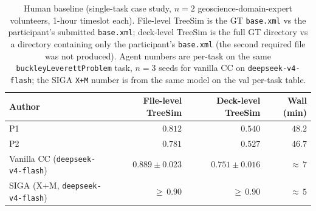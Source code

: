 \documentclass{article}
\begin{document}
\begin{table}[h]
  \caption{Human baseline (single-task case study, $n=2$ geoscience-domain-expert volunteers, 1-hour timeslot each). File-level TreeSim is the GT \texttt{base.xml} vs the participant's submitted \texttt{base.xml}; deck-level TreeSim is the full GT directory vs a directory containing only the participant's \texttt{base.xml} (the second required file was not produced). Agent numbers are per-task on the same \texttt{buckleyLeverettProblem} task, $n=3$ seeds for vanilla CC on \texttt{deepseek-v4-flash}; the SIGA \texttt{X+M} number is from the same model on the val per-task table.}
  \label{tab:human-baseline}
  \centering
  \small
  \begin{tabular}{lrrr}
    \toprule
    \textbf{Author} & \textbf{File-level TreeSim} & \textbf{Deck-level TreeSim} & \textbf{Wall (min)} \\
    \midrule
    P1                                       & $0.812$            & $0.540$            & $48.2$ \\
    P2                                       & $0.781$            & $0.527$            & $46.7$ \\
    Vanilla CC (\texttt{deepseek-v4-flash})  & $0.889 \pm 0.023$  & $0.751 \pm 0.016$  & ${\approx}\,7$ \\
    SIGA (X+M, \texttt{deepseek-v4-flash})   & ${\geq}\,0.90$     & ${\geq}\,0.90$     & ${\approx}\,5$ \\
    \bottomrule
  \end{tabular}
\end{table}
\end{document}
